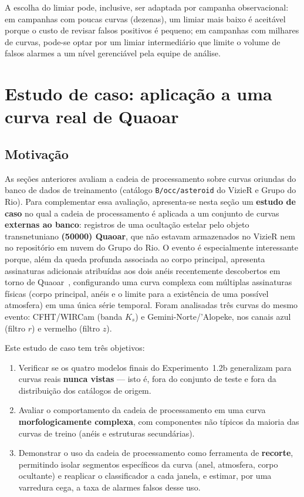 A escolha do limiar pode, inclusive, ser adaptada por campanha observacional: em campanhas com poucas curvas (dezenas), um limiar mais baixo é aceitável porque o custo de revisar falsos positivos é pequeno; em campanhas com milhares de curvas, pode-se optar por um limiar intermediário que limite o volume de falsos alarmes a um nível gerenciável pela equipe de análise.

\section{Estudo de caso: aplicação a uma curva real de Quaoar}
\label{sec:estudo_caso_quaoar}

\subsection{Motivação}

As seções anteriores avaliam a cadeia de processamento sobre curvas oriundas do banco de dados de treinamento (catálogo \texttt{B/occ/asteroid} do VizieR e Grupo do Rio). Para complementar essa avaliação, apresenta-se nesta seção um \textbf{estudo de caso} no qual a cadeia de processamento é aplicada a um conjunto de curvas \textbf{externas ao banco}: registros de uma ocultação estelar pelo objeto transnetuniano \textbf{(50000) Quaoar}, que não estavam armazenados no VizieR nem no repositório em nuvem do Grupo do Rio. O evento é especialmente interessante porque, além da queda profunda associada ao corpo principal, apresenta assinaturas adicionais atribuídas aos dois anéis recentemente descobertos em torno de Quaoar~\citep{Quaoar2023, Morgado2023}, configurando uma curva complexa com múltiplas assinaturas físicas (corpo principal, anéis e o limite para a existência de uma possível atmosfera) em uma única série temporal. Foram analisadas três curvas do mesmo evento: CFHT/WIRCam (banda $K_s$) e Gemini-Norte/'Alopeke, nos canais azul (filtro $r$) e vermelho (filtro $z$).

Este estudo de caso tem três objetivos:
\begin{enumerate}
	\item Verificar se os quatro modelos finais do Experimento~1.2b generalizam para curvas reais \textbf{nunca vistas} --- isto é, fora do conjunto de teste e fora da distribuição dos catálogos de origem.
	\item Avaliar o comportamento da cadeia de processamento em uma curva \textbf{morfologicamente complexa}, com componentes não típicos da maioria das curvas de treino (anéis e estruturas secundárias).
	\item Demonstrar o uso da cadeia de processamento como ferramenta de \textbf{recorte}, permitindo isolar segmentos específicos da curva (anel, atmosfera, corpo ocultante) e reaplicar o classificador a cada janela, e estimar, por uma varredura cega, a taxa de alarmes falsos desse uso.
\end{enumerate}

